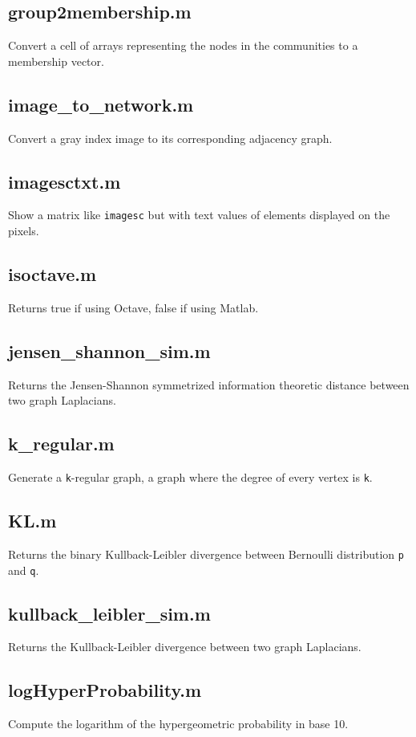 \begin{itemize}[<+->]
  \subsection*{group2membership.m} Convert a cell of arrays representing the
  nodes in the communities to a membership vector.

  \subsection*{image\_to\_network.m} Convert a gray index image to its
  corresponding adjacency graph.

  \subsection*{imagesctxt.m} Show a matrix like \texttt{imagesc} but with
  text values of elements displayed on the pixels.

  \subsection*{isoctave.m} Returns true if using Octave, false if using
  Matlab.

  \subsection*{jensen\_shannon\_sim.m} Returns the Jensen-Shannon symmetrized
  information theoretic distance between two graph Laplacians.

  \subsection*{k\_regular.m} Generate a \texttt{k}-regular graph, a graph
  where the degree of every vertex is \texttt{k}.

  \subsection*{KL.m} Returns the binary Kullback-Leibler divergence between
  Bernoulli distribution \texttt{p} and \texttt{q}.

  \subsection*{kullback\_leibler\_sim.m} Returns the Kullback-Leibler
  divergence between two graph Laplacians.

  \subsection*{logHyperProbability.m} Compute the logarithm of the
  hypergeometric probability in base 10.


\end{itemize}
